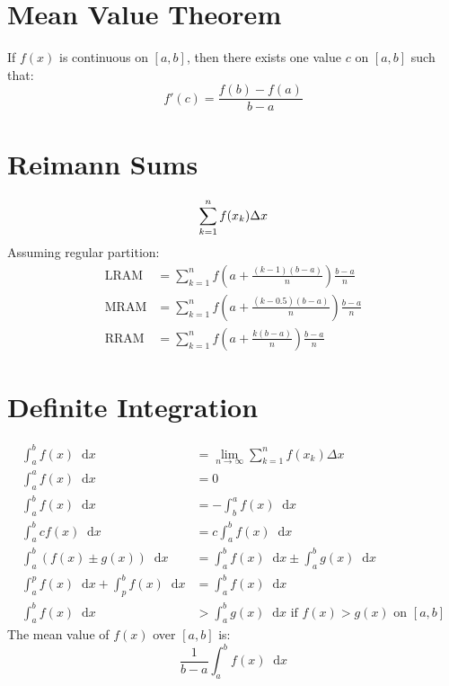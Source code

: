 \documentclass[12pt]{article}
\newcommand*{\D}[1]{\mathop{}\!\mathrm{d} #1}
\newenvironment{rmaskip}{\setlength{\abovedisplayskip}{0pt}\ignorespaces}%
  {\ignorespacesafterend}
\newenvironment{rmbskip}{\setlength{\belowdisplayskip}{0pt}\ignorespaces}%
  {\ignorespacesafterend}
\begin{document}
\section*{Mean Value Theorem}
If \(f(x)\) is continuous on \([a,b]\), then there exists one value \(c\) on
\([a,b]\) such that:
\begin{rmbskip}
  \[
    f'(c) = \frac{f(b) - f(a)}{b - a}
  \]
\end{rmbskip}
\section*{Reimann Sums}
\[
  \sum_{k=1}^n f(x_k) \Delta x\\
\]
Assuming regular partition:
\begin{rmbskip}
  \begin{align*}
    \text{LRAM} &= \sum_{k=1}^n f\left(a + \frac{(k-1)(b - a)}{n}\right)
      \frac{b-a}{n}\\
    \text{MRAM} &= \sum_{k=1}^n f\left(a + \frac{(k-0.5)(b - a)}{n}\right)
      \frac{b-a}{n}\\
    \text{RRAM} &= \sum_{k=1}^n f\left(a + \frac{k(b - a)}{n}\right)
      \frac{b-a}{n}
  \end{align*}
\end{rmbskip}
\section*{Definite Integration}
\begin{rmaskip}
  \begin{align*}
    \int_a^b f(x) \D{x} &= \lim_{n \to \infty} \sum_{k=1}^n f(x_k)\Delta x\\
    \int_a^a f(x) \D{x} &= 0\\
    \int_a^b f(x) \D{x} &= -\int_b^a f(x) \D{x}\\
    \int_a^b c f(x) \D{x} &= c \int_a^b f(x) \D{x}\\
    \int_a^b (f(x) \pm g(x)) \D{x} &= \int_a^b f(x) \D{x} \pm \int_a^b g(x)
      \D{x}\\
    \int_a^p f(x) \D{x} + \int_p^b f(x) \D{x} &= \int_a^b f(x) \D{x}\\
    \int_a^b f(x) \D{x} &> \int_a^b g(x) \D{x} \text{ if }f(x) > g(x)
      \text{ on } [a,b]
  \end{align*}
\end{rmaskip}
The mean value of \(f(x)\) over \([a,b]\) is:
\begin{rmbskip}
  \[
    \frac{1}{b - a} \int_a^b f(x) \D{x}
  \]
\end{rmbskip}
\end{document}
